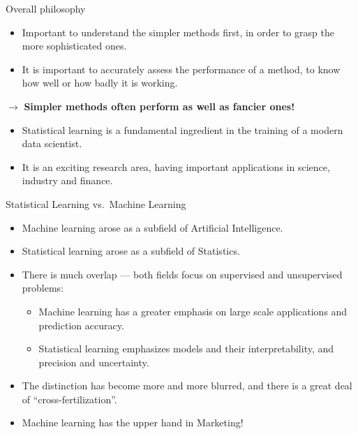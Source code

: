 \documentclass[ignorenonframetext,]{beamer}
\providecommand{\tightlist}{%
  \setlength{\itemsep}{0pt}\setlength{\parskip}{0pt}}
\begin{document}
\begin{frame}{Overall philosophy}

\begin{itemize}
\item
  Important to understand the simpler methods first, in order to grasp
  the more sophisticated ones.
\item
  It is important to accurately assess the performance of a method, to
  know how well or how badly it is working.
\end{itemize}

\(\rightarrow\) \textbf{Simpler methods often perform as well as fancier
ones!}

\begin{itemize}
\item
  Statistical learning is a fundamental ingredient in the training of a
  modern data scientist.
\item
  It is an exciting research area, having important applications in
  science, industry and finance.
\end{itemize}

\end{frame}

\begin{frame}{Statistical Learning vs.~Machine Learning}

\begin{itemize}
\item
  Machine learning arose as a subfield of Artificial Intelligence.
\item
  Statistical learning arose as a subfield of Statistics.
\item
  There is much overlap --- both fields focus on supervised and
  unsupervised problems:

  \begin{itemize}
  \tightlist
  \item
    Machine learning has a greater emphasis on large scale applications
    and prediction accuracy.
  \item
    Statistical learning emphasizes models and their interpretability,
    and precision and uncertainty.
  \end{itemize}
\item
  The distinction has become more and more blurred, and there is a great
  deal of ``cross-fertilization''.
\item
  Machine learning has the upper hand in Marketing!
\end{itemize}

\end{frame}
\end{document}
